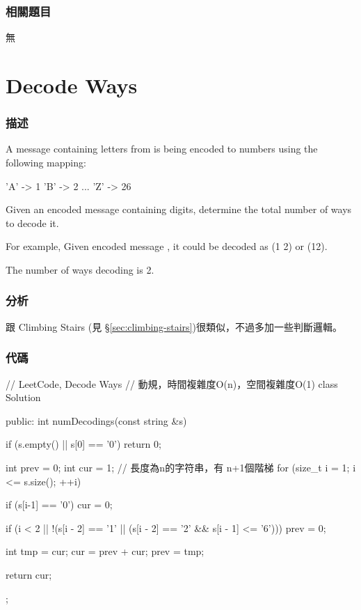 \subsubsection{相關題目}
\begindot
\item 無
\myenddot


\section{Decode Ways} %
\label{sec:decode-ways}


\subsubsection{描述}
A message containing letters from  is being encoded to numbers using the following mapping:
\begin{Code}
'A' -> 1
'B' -> 2
...
'Z' -> 26
\end{Code}

Given an encoded message containing digits, determine the total number of ways to decode it.

For example,
Given encoded message , it could be decoded as  (1 2) or  (12).

The number of ways decoding  is 2.


\subsubsection{分析}
跟 Climbing Stairs (見 \S \ref{sec:climbing-stairs})很類似，不過多加一些判斷邏輯。


\subsubsection{代碼}
\begin{Code}
// LeetCode, Decode Ways
// 動規，時間複雜度O(n)，空間複雜度O(1)
class Solution {
public:
    int numDecodings(const string &s) {
        if (s.empty() || s[0] == '0') return 0;

        int prev = 0;
        int cur = 1;
        // 長度為n的字符串，有 n+1個階梯
        for (size_t i = 1; i <= s.size(); ++i) {
            if (s[i-1] == '0') cur = 0;

            if (i < 2 || !(s[i - 2] == '1' ||
                     (s[i - 2] == '2' && s[i - 1] <= '6')))
                prev = 0;

            int tmp = cur;
            cur = prev + cur;
            prev = tmp;
        }
        return cur;
    }
};
\end{Code}


